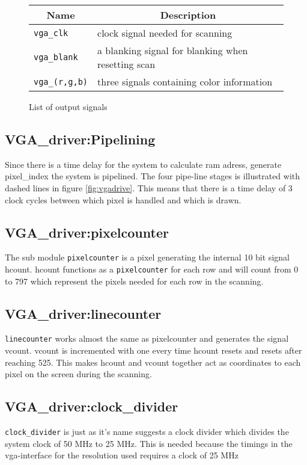 \begin{figure}[H]
        \centering              
        \caption{List of output signals}
        \label{tab:output}
\begin{tabular}{|l|l|}
        \hline
        \multicolumn{1}{|c|}{Name} & \multicolumn{1}{|c|}{Description} \\
        \hline
        \verb+vga_clk+ & clock signal needed for scanning\\
        \cline{1-2}
        \hline
        \verb+vga_blank+ & a blanking signal for blanking when resetting scan\\
        \cline{1-2}    
        \hline
        \verb+vga_(r,g,b)+ & three signals containing color information\\
        \cline{1-2}    
        \hline
\end{tabular}
\end{figure}

\subsection{VGA\_driver:Pipelining}
Since there is a time delay for the system to calculate ram adress, generate pixel\_index the system is
pipelined. The four pipe-line stages is illustrated with dashed lines in figure \ref{fig:vgadrive}.
This means that there is a time delay of 3 clock cycles between which pixel is handled and which is drawn. 

\subsection{VGA\_driver:pixelcounter} 
The sub module \verb+pixelcounter+ is a pixel generating the internal 10 bit signal hcount. hcount
functions as a \verb+pixelcounter+ for each row and will count from 0 to 797 which represent the
pixels needed for each row in the scanning. 
 
\subsection{VGA\_driver:linecounter}
\verb+linecounter+ works almost the same as pixelcounter and generates the signal vcount. vcount is
incremented with one every time hcount resets and resets after reaching 525. This makes hcount and vcount together act as
coordinates to each pixel on the screen during the scanning.

\subsection{VGA\_driver:clock\_divider}
\verb+clock_divider+ is just as it's name suggests a clock divider which divides the system clock of 50 MHz
to 25 MHz. This is needed because the timings in the vga-interface for the resolution used 
requires a clock of 25 MHz 

